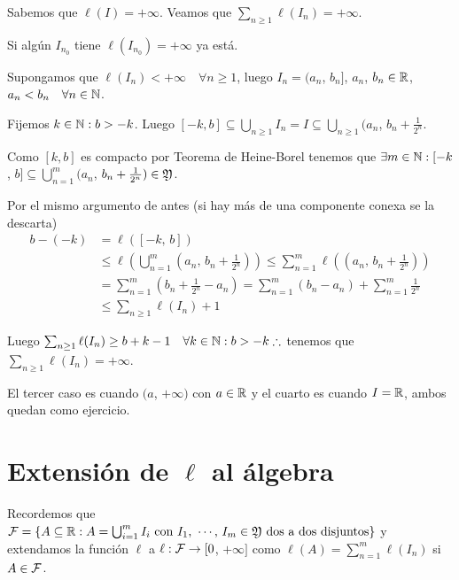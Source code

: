 Sabemos que $\ell(I) = +\infty$. Veamos que $\sum_{n \geq 1} \ell(I_n) = +\infty$.

Si algún $I_{n_0}$ tiene $\ell(I_{n_0}) = +\infty$ ya está.

Supongamos que $\ell(I_n) < +\infty \quad \forall n \geq 1$, luego $I_n = (a_n$, $b_n]$, $a_n$, $b_n \in \mathbb{R}$, $a_n < b_n \quad \forall n \in \mathbb{N}$.

Fijemos $k \in \mathbb{N} : b > -k$. Luego $[-k, b] \subseteq \bigcup_{n \geq 1} I_n = I \subseteq \bigcup_{n \geq 1} (a_n$, $b_n + \frac{1}{2^n}$.

Como $[k, b]$ es compacto por Teorema de Heine-Borel tenemos que $\exists m \in \mathbb{N} : [-k$, $b] \subseteq \bigcup_{n = 1}^m (a_n$, $b_n + \frac{1}{2^n}) \in \mathfrak{Y}$.

Por el mismo argumento de antes (si hay más de una componente conexa se la descarta) \begin{align*}
    b - (-k) & = \ell([-k \text{, } b])                                                                                                     \\
             & \leq \ell(\bigcup_{n = 1}^m (a_n\text{, } b_n + \frac{1}{2^n})) \leq \sum_{n = 1}^m \ell((a_n\text{, } b_n + \frac{1}{2^n})) \\
             & = \sum_{n = 1}^m (b_n + \frac{1}{2^n} - a_n) = \sum_{n = 1}^m (b_n - a_n) + \sum_{n = 1}^m \frac{1}{2^n}                     \\
             & \leq \sum_{n \geq 1} \ell(I_n) + 1
\end{align*}

Luego $\sum_{n \geq 1} \ell(I_n) \geq b + k - 1 \quad \forall k \in \mathbb{N} : b > -k \therefore$ tenemos que $\sum_{n \geq 1} \ell(I_n) = +\infty$.

El tercer caso es cuando $(a$, $+\infty)$ con $a \in \mathbb{R}$ y el cuarto es cuando $I = \mathbb{R}$, ambos quedan como ejercicio.

\clearpage

\section{Extensión de $\ell$ al álgebra}

Recordemos que $\mathcal{F} = \{ A \subseteq \mathbb{R} : A = \bigcup_{i = 1}^m I_i \text{ con } I_1 \text{, } \cdots \text{, } I_m \in \mathfrak{Y} \text{ dos a dos disjuntos} \}$ y extendamos la función
$\ell$ a $\ell: \mathcal{F} \to [0$, $+\infty]$ como $\ell(A) = \sum_{n = 1}^m \ell(I_n)$ si $A \in \mathcal{F}$.

